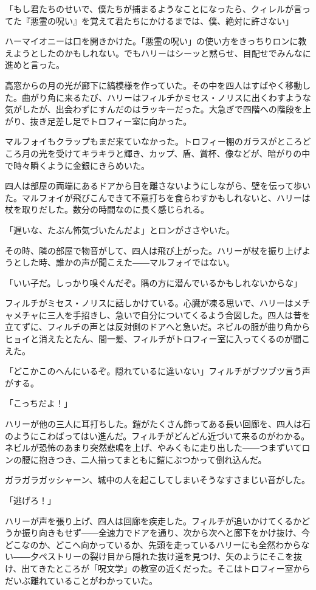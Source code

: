 \documentclass[10pt,a4paper]{article}
\begin{document}
\begin{CJK}{UTF8}{min}
「もし君たちのせいで、僕たちが捕まるようなことになったら、クィレルが言ってた『悪霊の呪い』を覚えて君たちにかけるまでは、僕、絶対に許さない」

ハーマイオニーは口を開きかけた。「悪霊の呪い」の使い方をきっちりロンに教えようとしたのかもしれない。でもハリーはシーッと黙らせ、目配せでみんなに進めと言った。

高窓からの月の光が廊下に縞模様を作っていた。その中を四人はすばやく移動した。曲がり角に来るたび、ハリーはフィルチかミセス・ノリスに出くわすような気がしたが、出会わずにすんだのはラッキーだった。大急ぎで四階への階段を上がり、抜き足差し足でトロフィー室に向かった。

マルフォイもクラップもまだ来ていなかった。トロフィー棚のガラスがところどころ月の光を受けてキラキラと輝き、カップ、盾、賞杯、像などが、暗がりの中で時々瞬くように金銀にきらめいた。

四人は部屋の両端にあるドアから目を離さないようにしながら、壁を伝って歩いた。マルフォイが飛びこんできて不意打ちを食らわすかもしれないと、ハリーは杖を取りだした。数分の時間なのに長く感じられる。

「遅いな、たぶん怖気づいたんだよ」とロンがささやいた。

その時、隣の部屋で物音がして、四人は飛び上がった。ハリーが杖を振り上げようとした時、誰かの声が聞こえた――マルフォイではない。

「いい子だ。しっかり嗅ぐんだぞ。隅の方に潜んでいるかもしれないからな」

フィルチがミセス・ノリスに話しかけている。心臓が凍る思いで、ハリーはメチャメチャに三人を手招きし、急いで自分についてくるよう合図した。四人は昔を立てずに、フィルチの声とは反対側のドアへと急いだ。ネビルの服が曲り角からヒョイと消えたとたん、間一髪、フィルチがトロフィー室に入ってくるのが聞こえた。

「どこかこのへんにいるぞ。隠れているに違いない」フィルチがブツブツ言う声がする。

「こっちだよ！」

ハリーが他の三人に耳打ちした。鎧がたくさん飾ってある長い回廊を、四人は石のようにこわばってはい進んだ。フィルチがどんどん近づいて来るのがわかる。ネビルが恐怖のあまり突然悲鳴を上げ、やみくもに走り出した――つまずいてロンの腰に抱きつき、二人揃ってまともに鎧にぶつかって倒れ込んだ。

ガラガラガッシャーン、城中の人を起こしてしまいそうなすさまじい音がした。

「逃げろ！」

ハリーが声を張り上げ、四人は回廊を疾走した。フィルチが追いかけてくるかどうか振り向きもせず――全速力でドアを通り、次から次へと廊下をかけ抜け、今どこなのか、どこへ向かっているか、先頭を走っているハリーにも全然わからない――夕ペストリーの裂け目から隠れた抜け道を見つけ、矢のようにそこを抜け、出てきたところが「呪文学」の教室の近くだった。そこはトロフィー室からだいぶ離れていることがわかっていた。


\end{CJK}
\end{document}
